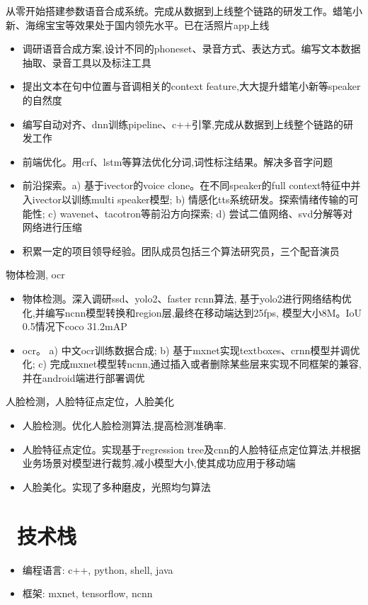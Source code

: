 \documentclass{resume}
\begin{document}
从零开始搭建参数语音合成系统。完成从数据到上线整个链路的研发工作。蜡笔小新、海绵宝宝等效果处于国内领先水平。已在活照片app上线
\begin{itemize}
  \item 调研语音合成方案,设计不同的phoneset、录音方式、表达方式。编写文本数据抽取、录音工具以及标注工具
  \item 提出文本在句中位置与音调相关的context feature,大大提升蜡笔小新等speaker的自然度
  \item 编写自动对齐、dnn训练pipeline、c++引擎,完成从数据到上线整个链路的研发工作
  \item 前端优化。用crf、lstm等算法优化分词,词性标注结果。解决多音字问题
  \item 前沿探索。a) 基于ivector的voice clone。在不同speaker的full context特征中并入ivector以训练multi speaker模型; b)  情感化tts系统研发。探索情绪传输的可能性; c) wavenet、tacotron等前沿方向探索; d) 尝试二值网络、svd分解等对网络进行压缩
  \item 积累一定的项目领导经验。团队成员包括三个算法研究员，三个配音演员
\end{itemize}

物体检测, ocr
\begin{itemize}
  \item 物体检测。深入调研ssd、yolo2、faster rcnn算法, 基于yolo2进行网络结构优化,并编写ncnn模型转换和region层,最终在移动端达到25fps, 模型大小8M。IoU 0.5情况下coco 31.2mAP
  \item ocr。 a) 中文ocr训练数据合成; b) 基于mxnet实现textboxes、crnn模型并调优化; c) 完成mxnet模型转ncnn,通过插入或者删除某些层来实现不同框架的兼容,并在android端进行部署调优
\end{itemize}

人脸检测，人脸特征点定位，人脸美化
\begin{itemize}
  \item 人脸检测。优化人脸检测算法,提高检测准确率.
  \item 人脸特征点定位。实现基于regression tree及cnn的人脸特征点定位算法,并根据业务场景对模型进行裁剪,减小模型大小,使其成功应用于移动端
  \item 人脸美化。实现了多种磨皮，光照均匀算法
\end{itemize}

\section{\faCogs\ 技术栈}
\begin{itemize}[parsep=0.5ex]
  \item 编程语言: c++, python, shell, java
  \item 框架: mxnet, tensorflow, ncnn
\end{itemize}
\end{document}
